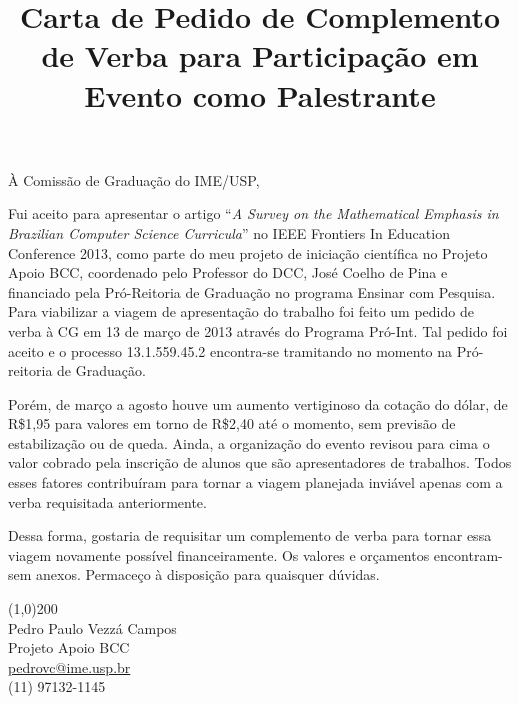 \documentclass[brazil]{article}
\newcommand{\brl}{R\$}
\begin{document}
\title{Carta de Pedido de Complemento de Verba para Participação em Evento como Palestrante}

\maketitle

\begin{flushleft}
À Comissão de Graduação do IME/USP,
\end{flushleft}


Fui aceito para apresentar o artigo ``\emph{A Survey on the Mathematical Emphasis in Brazilian Computer Science Curricula}'' no IEEE Frontiers In Education Conference 2013, como parte do meu projeto de iniciação científica no Projeto Apoio BCC, coordenado pelo Professor do DCC, José Coelho de Pina e financiado pela Pró-Reitoria de Graduação no programa Ensinar com Pesquisa. Para viabilizar a viagem de apresentação do trabalho foi feito um pedido de verba à CG em 13 de março de 2013 através do Programa Pró-Int. Tal pedido foi aceito e o processo 13.1.559.45.2 encontra-se tramitando no momento na Pró-reitoria de Graduação.

Porém, de março a agosto houve um aumento vertiginoso da cotação do dólar, de \brl1,95 para valores em torno de \brl2,40 até o momento, sem previsão de estabilização ou de queda. Ainda, a organização do evento revisou para cima o valor cobrado pela inscrição de alunos que são apresentadores de trabalhos. Todos esses fatores contribuíram para tornar a viagem planejada inviável apenas com a verba requisitada anteriormente.

Dessa forma, gostaria de requisitar um complemento de verba para tornar essa viagem novamente possível financeiramente. Os valores e orçamentos encontram-sem anexos. Permaceço à disposição para quaisquer dúvidas.


\vfill

\begin{flushright}
\line(1,0){200}\\
Pedro Paulo Vezzá Campos\\
Projeto Apoio BCC\\
\url{pedrovc@ime.usp.br}\\
(11) 97132-1145
\end{flushright}

\newpage 
\end{document}
